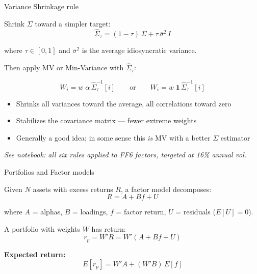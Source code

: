 \documentclass[aspectratio=169,10pt]{beamer}
\begin{document}

\begin{frame}{Variance Shrinkage rule}

Shrink $\Sigma$ toward a simpler target:
$$\hat{\Sigma}_\tau = (1 - \tau) \, \Sigma + \tau \, \bar{\sigma}^2 \, I$$

\vskip 5pt

where $\tau \in [0,1]$ and $\bar{\sigma}^2$ is the average idiosyncratic variance.

\vskip 8pt

Then apply MV or Min-Variance with $\hat{\Sigma}_\tau$:

$$W_i = w \; \alpha \, \hat{\Sigma}_\tau^{-1}[i] \qquad \text{or} \qquad W_i = w \; \mathbf{1} \, \hat{\Sigma}_\tau^{-1}[i]$$

\vskip 10pt

\begin{itemize}
\item Shrinks all variances toward the average, all correlations toward zero
\item Stabilizes the covariance matrix --- fewer extreme weights
\item Generally a good idea; in some sense this \textit{is} MV with a better $\Sigma$ estimator
\end{itemize}

\vskip 5pt

\textit{See notebook: all six rules applied to FF6 factors, targeted at 16\% annual vol.}

\end{frame}


\begin{frame}{Portfolios and Factor models}

Given $N$ assets with excess returns $R$, a factor model decomposes:
$$R = A + B f + U$$

\vskip 5pt

where $A$ = alphas, $B$ = loadings, $f$ = factor return, $U$ = residuals ($E[U] = 0$).

\vskip 10pt

A portfolio with weights $W$ has return:
$$r_p = W' R = W'(A + Bf + U)$$

\vskip 10pt

\textbf{Expected return:}
$$E[r_p] = W' A + (W' B) \, E[f]$$

\end{frame}
\end{document}
